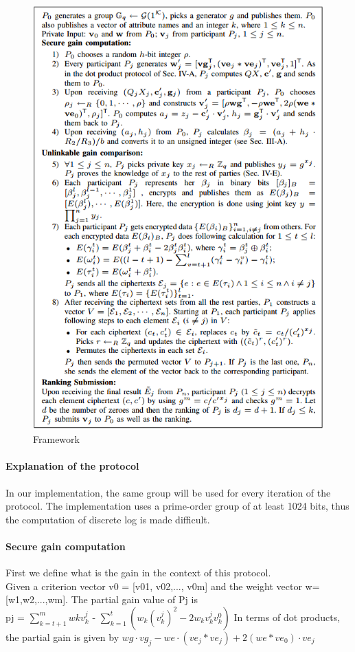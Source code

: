 \documentclass[11pt, a4paper, twoside, openright]{book} %
\begin{document}
\begin{figure}
	\includegraphics[width=\linewidth] {framework.png}
	\caption{Framework}

\end{figure}


\paragraph{Explanation of the protocol}
In our implementation, the same group will be used for every iteration of the protocol. The implementation uses a prime-order group of at least 1024 bits, thus the computation of discrete log is made difficult. 

\paragraph*{Secure gain computation}
First we define what is the gain in the context of this protocol.\\
Given a criterion vector v0 = [v01, v02,..., v0m] and the weight vector w=[w1,w2,...,wm]. The partial gain value of Pj is \\
pj = $\sum_{k=t+1}^{m} wkv_{k}^{j}$ - $\sum_{k=1}^{t} (w_{k}(v_{k}^{j})^{2} - 2w_{k}v_{k}^{j}v_{k}^{0})$
In terms of dot products, the partial gain is given by $wg\cdot vg_{j} - we\cdot (ve_{j}*ve_{j})+2(we*ve_{0})\cdot ve_{j}$
\end{document}
